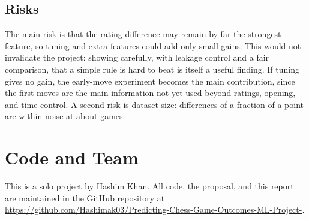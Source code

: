 \documentclass[sigconf]{acmart}
\begin{document}
\subsection{Risks}
The main risk is that the rating difference may remain by far the strongest feature, so tuning and extra features could add only small gains. This would not invalidate the project: showing carefully, with leakage control and a fair comparison, that a simple rule is hard to beat is itself a useful finding. If tuning gives no gain, the early-move experiment becomes the main contribution, since the first moves are the main information not yet used beyond ratings, opening, and time control. A second risk is dataset size: differences of a fraction of a point are within noise at about \nBinary{} games.

\section{Code and Team}
This is a solo project by Hashim Khan. All code, the proposal, and this report are maintained in the GitHub repository at \url{https://github.com/Hashimak03/Predicting-Chess-Game-Outcomes-ML-Project-}.



\end{document}
